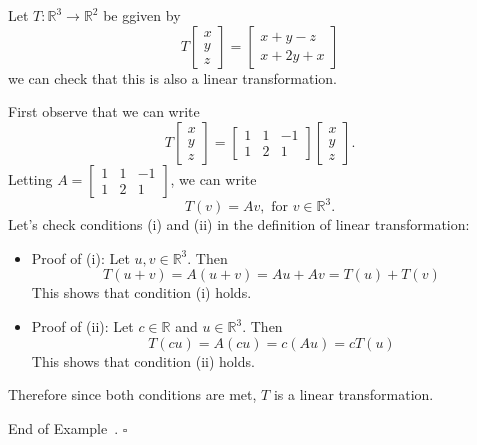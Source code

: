 \documentclass[10pt]{article}
\theoremstyle{definition}
\newtheorem{example}[theorem]{Example}
\renewenvironment{example}
{\begin{oldexample}}
  {\par\smallskip\hfill   End of Example~\theexample. $\square$    \par\end{oldexample}}
\newcommand{\R}{\mathbb{R}}           %
\begin{document}
\begin{example}
  Let $T:\R^{3}\to \R^{2}$ be ggiven by
  \begin{equation*}
    T
    \begin{bmatrix}
      x\\y\\z
    \end{bmatrix}
    =
    \begin{bmatrix}
      x+y-z\\
      x+2y+x
    \end{bmatrix}
  \end{equation*}
  we can check that this is also a linear transformation.

  First observe that we can write
  \begin{equation*}
    T
    \begin{bmatrix}
      x\\y\\z
    \end{bmatrix}
    =
    \begin{bmatrix}
      1&1&-1\\
      1&2&1
    \end{bmatrix}
    \begin{bmatrix}
      x\\y\\z
    \end{bmatrix}.
  \end{equation*}
  Letting $A =  \begin{bmatrix}
    1&1&-1\\
    1&2&1
  \end{bmatrix}$, we can write
  \begin{equation*}
    T(v) = Av, \text{ for }v\in \R^{3}.
  \end{equation*}
  Let's check conditions (i) and (ii) in the definition of linear transformation:
  \begin{itemize}
    \item Proof of (i): Let $u,v\in \R^{3}$. Then
    \begin{equation*}
      T(u+v) = A(u+v) = Au+Av = T(u)+T(v)
    \end{equation*}
    This shows that condition (i) holds. 
    \item Proof of (ii): Let $c\in \R$ and $u\in \R^{3}$. Then
    \begin{equation*}
      T(cu )= A(cu) = c(Au) = cT(u)
    \end{equation*}
    This shows that condition (ii) holds.
  \end{itemize}
  Therefore since both conditions are met, $T$ is a linear transformation.
\end{example}
\end{document}
